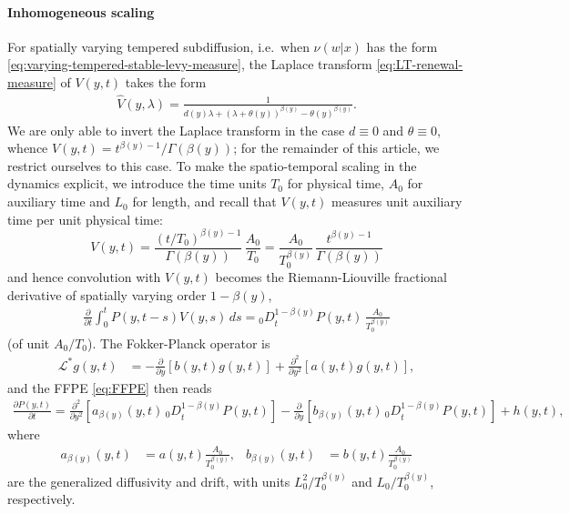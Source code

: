 \documentclass[a4paper,12pt]{elsarticle}
\numberwithin{equation}{section}
\theoremstyle{plain}
\theoremstyle{definition}
\theoremstyle{remark}
\numberwithin{equation}{section}
\newcommand{\1}{\mathbf 1}
\begin{document}
\paragraph{Inhomogeneous scaling}
For spatially varying tempered subdiffusion, i.e.\ when $\nu(w|x)$ has the form 
\eqref{eq:varying-tempered-stable-levy-measure}, 
the Laplace transform \eqref{eq:LT-renewal-measure} of $V(y,t)$ takes the form
\begin{align}
\hat V(y,\lambda) =
\frac{1}{d(y) \lambda + (\lambda + \theta(y))^{\beta(y)} - \theta(y)^{\beta(y)}}.
\end{align}
We are only able to invert the Laplace transform in the case $d \equiv 0$ and
$\theta \equiv 0$, whence $V(y,t) = t^{\beta(y)-1} / \Gamma(\beta(y))$; 
for the remainder of this article, we restrict ourselves to this case.
To make the spatio-temporal scaling in the dynamics explicit, we introduce the time units
$T_0$ for physical time, $A_0$ for auxiliary time and $L_0$ for length, 
and recall that $V(y,t)$ measures unit auxiliary time per unit physical 
time:
$$V(y,t) = \frac{(t/T_0)^{\beta(y)-1}}{\Gamma(\beta(y))}\, \frac{A_0}{T_0}
= \frac{A_0}{T_0^{\beta(y)}} \, \frac{t^{\beta(y) - 1}}{\Gamma(\beta(y))}$$
and hence convolution with $V(y,t)$ becomes the Riemann-Liouville
fractional derivative of spatially varying order $1-\beta(y)$, 
\begin{align}
  \frac{\partial}{\partial t} \int_0^t P(y,t-s) V(y,s)\,ds
  = {_0D}_t^{1-\beta(y)} P(y,t) \, \frac{A_0}{T_0^{\beta(y)}}
\end{align}
(of unit $A_0 / T_0$).
The Fokker-Planck operator is
\begin{align}
\mathcal L^* g(y,t)
&= -\frac{\partial }{\partial y}[b(y,t) g(y,t)]
+\frac{\partial^2 }{\partial y^2}[a(y,t) g(y,t)],
\end{align}
and the FFPE \eqref{eq:FFPE} then reads
\begin{align} \label{eq:FFPE-with-scale}
\frac{\partial P(y,t)}{\partial t}
= \frac{\partial^2}{\partial y^2} \left[a_{\beta(y)}(y,t)
  \, {_0 D}_t^{1-\beta(y)} P(y,t)\right]
  - \frac{\partial}{\partial y} \left[b_{\beta(y)}(y,t)
  \, {_0 D}_t^{1-\beta(y)} P(y,t)\right]
  + h(y,t),
\end{align}
where 
\begin{align} \label{eq:generalized-coefficients}
  a_{\beta(y)}(y,t) &= a(y,t) \frac{A_0}{T_0^{\beta(y)}}, 
  & 
  b_{\beta(y)}(y,t) &= b(y,t) \frac{A_0}{T_0^{\beta(y)}}
\end{align}
are the generalized diffusivity and drift, with units 
$L_0^2/T_0^{\beta(y)}$ and $L_0/T_0^{\beta(y)}$, respectively. 
\end{document}
